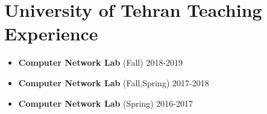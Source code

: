 \documentclass[a4paper,10pt]{article} %
\begin{document}
\color{blue}
\section{University of Tehran Teaching Experience}
\color{Black}
\begin{itemize}
	
	\item	
		\textbf{Computer Network Lab } (Fall) 
		\hfill {2018-2019}
	
	\item	
		\textbf{Computer Network Lab } (Fall,Spring)
		\hfill {2017-2018}	
	
	\item	
		\textbf{Computer Network Lab } (Spring) 
		\hfill {2016-2017}
		
\end{itemize}
\end{document}
